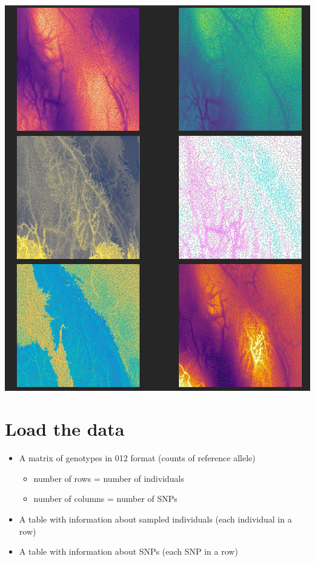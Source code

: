 \documentclass[
]{article}
\providecommand{\tightlist}{%
  \setlength{\itemsep}{0pt}\setlength{\parskip}{0pt}}
\begin{document}
\includegraphics{multivar.png}

\hypertarget{load-the-data}{%
\section{Load the data}\label{load-the-data}}

\begin{itemize}
\tightlist
\item
  A matrix of genotypes in 012 format (counts of reference allele)

  \begin{itemize}
  \tightlist
  \item
    number of rows = number of individuals
  \item
    number of columns = number of SNPs
  \end{itemize}
\item
  A table with information about sampled individuals (each individual in
  a row)
\item
  A table with information about SNPs (each SNP in a row)
\end{itemize}
\end{document}
